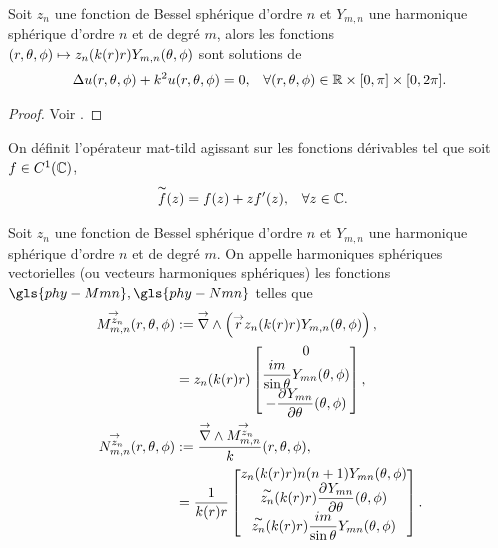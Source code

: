     \begin{prop}
        Soit \(z_n\) une fonction de Bessel sphérique d'ordre \(n\) et \(Y_{m,n}\) une harmonique sphérique d'ordre \(n\) et de degré \(m\), alors les fonctions \((r,\theta,\phi) \mapsto z_n(k(r)r)Y_{m,n}(\theta,\phi)\) sont solutions de 
        \begin{align*}
            \Delta u(r,\theta,\phi) + k^2u(r,\theta,\phi) = 0, && \forall (r,\theta,\phi) \in \mathbb R\times[0,\pi]\times[0,2\pi].
        \end{align*}
    \end{prop}
    \begin{proof}
        Voir \cite[section.~2.6.1]{nedelec_acoustic_2001}.
    \end{proof}

    \begin{defn}
        On définit l’opérateur \gls{mat-tild} agissant sur les fonctions dérivables tel que soit \(f \in C^1(\mathbb C)\),
        \begin{align*}
        &\overset{\thicksim}{f}(z) = f(z) + zf'(z), && \forall z \in \mathbb C.
        \end{align*}
    \end{defn}

    \begin{defn}
        \label{def:sphere:harmoniques_spheriques_vect}
        Soit \(z_n\) une fonction de Bessel sphérique d'ordre \(n\) et \(Y_{m,n}\) une harmonique sphérique d'ordre \(n\) et de degré \(m\).
        On appelle harmoniques sphériques vectorielles (ou vecteurs harmoniques sphériques) les fonctions \(\gls{phy-Mmn},\gls{phy-Nmn}\) telles que
        \begin{align}
            \label{eq:defMmn}
            \Mmn[z_n](\rtp) &:= \vrot \left( \vect{r} z_n(k(r)r) Y_{m,n}(\tp) \right),
            \\
            \notag&= z_n(k(r)r)
            \begin{bmatrix}
                0
                \\
                \frac{im}{\sin\theta}Y_{mn}(\tp)
                \\
                - \ddr{\theta}{Y_{mn}}(\tp)
            \end{bmatrix},
            \\
            \label{eq:defNnn}
            \Nmn[z_n](\rtp) &:= \frac{\vrot \Mmn[z_n]}{k}(\rtp),
            \\
            \notag&= \frac{1}{k(r)r}\begin{bmatrix}
                z_n(k(r)r)n(n+1)Y_{mn}(\tp)
                \\
                \tilde{z_n}(k(r)r)\ddr{\theta}{Y_{mn}}(\tp)
                \\
                \tilde{z_n}(k(r)r)\frac{im}{\sin\theta}Y_{mn}(\tp)
            \end{bmatrix}.
        \end{align}
    \end{defn}

